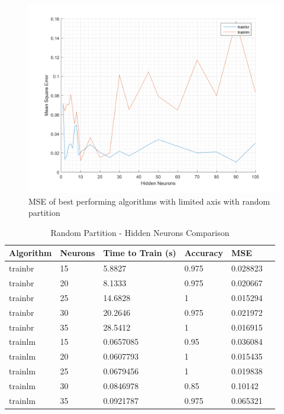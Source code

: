 \documentclass[a4paper, 10pt, conference]{ieeeconf}
\begin{document}
\begin{figure}[!ht]
    \centering
    \includegraphics[width=\linewidth]{pic/mixed_best_limited.png}
    \caption{MSE of best performing algorithms with limited axis with random partition}
    \label{fig:mixed_limited}
\end{figure}

\begin{table}
\centering
\caption{Random Partition - Hidden Neurons Comparison}
\label{tbl:mixed}
\begin{tabular}{llllll}
\hline
\textbf{Algorithm} & \textbf{Neurons} & \textbf{Time to Train (s)} & \textbf{Accuracy} & \textbf{MSE} \\ \hline
trainbr & 15 & 5.8827 & 0.975 & 0.028823 \\ \hline 
trainbr & 20 & 8.1333 & 0.975 & 0.020667 \\ \hline 
trainbr & 25 & 14.6828 & 1 & 0.015294 \\ \hline 
trainbr & 30 & 20.2646 & 0.975 & 0.021972 \\ \hline 
trainbr & 35 & 28.5412 & 1 & 0.016915 \\ \hline 

trainlm & 15 & 0.0657085 & 0.95 & 0.036084 \\ \hline 
trainlm & 20 & 0.0607793 & 1 & 0.015435 \\ \hline 
trainlm & 25 & 0.0679456 & 1 & 0.019838 \\ \hline 
trainlm & 30 & 0.0846978 & 0.85 & 0.10142 \\ \hline 
trainlm & 35 & 0.0921787 & 0.975 & 0.065321 \\ \hline 
\end{tabular}
\end{table}
\end{document}
